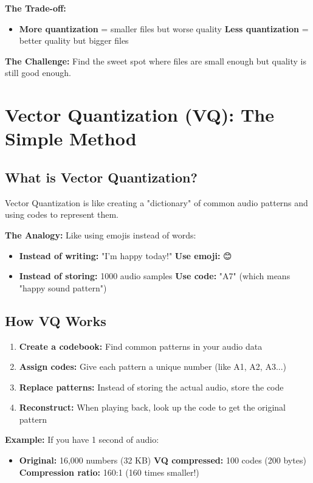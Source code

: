 \documentclass[12pt]{article}
\begin{document}
\textbf{The Trade-off:}
\begin{itemize}
    \item \textbf{More quantization} = smaller files but worse quality
    \textbf{Less quantization} = better quality but bigger files
\end{itemize}

\textbf{The Challenge:} Find the sweet spot where files are small enough but quality is still good enough.

\section{Vector Quantization (VQ): The Simple Method}

\subsection{What is Vector Quantization?}

Vector Quantization is like creating a "dictionary" of common audio patterns and using codes to represent them.

\textbf{The Analogy:} Like using emojis instead of words:
\begin{itemize}
    \item \textbf{Instead of writing:} "I'm happy today!"
    \textbf{Use emoji:} 😊
    \item \textbf{Instead of storing:} 1000 audio samples
    \textbf{Use code:} "A7" (which means "happy sound pattern")
\end{itemize}

\subsection{How VQ Works}

\begin{enumerate}
    \item \textbf{Create a codebook:} Find common patterns in your audio data
    \item \textbf{Assign codes:} Give each pattern a unique number (like A1, A2, A3...)
    \item \textbf{Replace patterns:} Instead of storing the actual audio, store the code
    \item \textbf{Reconstruct:} When playing back, look up the code to get the original pattern
\end{enumerate}

\textbf{Example:} If you have 1 second of audio:
\begin{itemize}
    \item \textbf{Original:} 16,000 numbers (32 KB)
    \textbf{VQ compressed:} 100 codes (200 bytes)
    \textbf{Compression ratio:} 160:1 (160 times smaller!)
\end{itemize}
\end{document}
